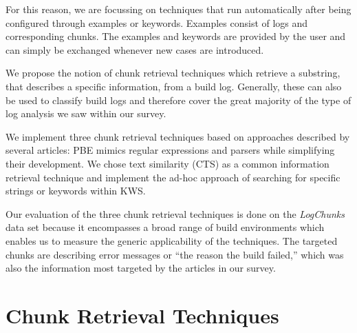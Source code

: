 For this reason, we are focussing on techniques that run automatically
after being configured through examples or keywords.
Examples consist of logs and corresponding chunks.
The examples and keywords are provided by the user and can simply be
exchanged whenever new cases are introduced.

We propose the notion of chunk retrieval techniques which retrieve
a substring, that describes a specific information, from a build log.
Generally, these can also be used to classify build logs and therefore
cover the great majority of the type of log analysis we saw within
our survey.

We implement three chunk retrieval techniques based on approaches
described by several articles:
PBE mimics regular expressions and parsers while simplifying
their development.
We chose text similarity (CTS) as a common information retrieval
technique and implement the ad-hoc approach of
searching for specific strings or keywords within KWS\@.

Our evaluation of the three chunk retrieval techniques is done on the
\emph{LogChunks} data set because it encompasses a broad range of
build environments which enables us to measure the generic
applicability of the techniques.
The targeted chunks are describing error messages or
``the reason the build failed,'' which was also the information
most targeted by the articles in our survey.


\section{Chunk Retrieval Techniques}
\label{sec:techniques}

